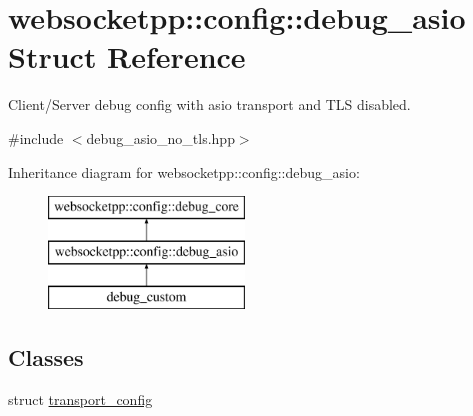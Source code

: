 \hypertarget{structwebsocketpp_1_1config_1_1debug__asio}{}\section{websocketpp\+:\+:config\+:\+:debug\+\_\+asio Struct Reference}
\label{structwebsocketpp_1_1config_1_1debug__asio}


Client/\+Server debug config with asio transport and T\+LS disabled.  




{\ttfamily \#include $<$debug\+\_\+asio\+\_\+no\+\_\+tls.\+hpp$>$}

Inheritance diagram for websocketpp\+:\+:config\+:\+:debug\+\_\+asio\+:\begin{figure}[H]
\begin{center}
\leavevmode
\includegraphics[height=3.000000cm]{structwebsocketpp_1_1config_1_1debug__asio}
\end{center}
\end{figure}
\subsection*{Classes}
\begin{DoxyCompactItemize}
\item 
struct \hyperlink{structwebsocketpp_1_1config_1_1debug__asio_1_1transport__config}{transport\+\_\+config}
\end{DoxyCompactItemize}
